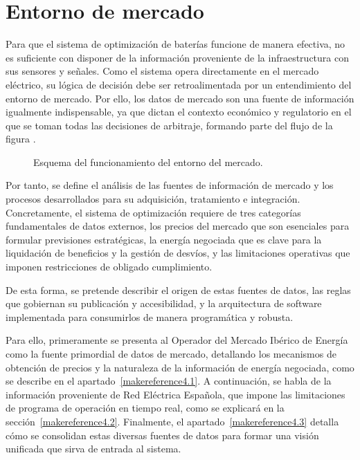\cleardoublepage

\chapter{Entorno de mercado}
\label{makereference4}

Para que el sistema de optimización de baterías funcione de manera efectiva, no es suficiente con disponer de la información proveniente de la infraestructura con sus sensores y señales. Como el sistema opera directamente en el mercado eléctrico, su lógica de decisión debe ser retroalimentada por un entendimiento del entorno de mercado. Por ello, los datos de mercado son una fuente de información igualmente indispensable, ya que dictan el contexto económico y regulatorio en el que se toman todas las decisiones de arbitraje, formando parte del flujo de la figura .

\begin{figure}
  \centering
  \caption{Esquema del funcionamiento del entorno del mercado.}
  \label{fig:esquema-mercado}
\end{figure}

Por tanto, se define el análisis de las fuentes de información de mercado y los procesos desarrollados para su adquisición, tratamiento e integración. Concretamente, el sistema de optimización requiere de tres categorías fundamentales de datos externos, los precios del mercado que son esenciales para formular previsiones estratégicas, la energía negociada que es clave para la liquidación de beneficios y la gestión de desvíos, y las limitaciones operativas que imponen restricciones de obligado cumplimiento.

De esta forma, se pretende describir el origen de estas fuentes de datos, las reglas que gobiernan su publicación y accesibilidad, y la arquitectura de software implementada para consumirlos de manera programática y robusta.

Para ello, primeramente se presenta al Operador del Mercado Ibérico de Energía como la fuente primordial de datos de mercado, detallando los mecanismos de obtención de precios y la naturaleza de la información de energía negociada, como se describe en el apartado~\ref{makereference4.1}. A continuación, se habla de la información proveniente de Red Eléctrica Española, que impone las limitaciones de programa de operación en tiempo real, como se explicará en la sección~\ref{makereference4.2}. Finalmente, el apartado~\ref{makereference4.3} detalla cómo se consolidan estas diversas fuentes de datos para formar una visión unificada que sirva de entrada al sistema.

